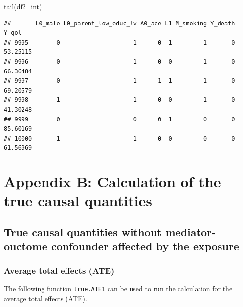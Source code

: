 \documentclass[
]{book}
\newenvironment{Shaded}{\begin{snugshade}}{\end{snugshade}}
\newcommand{\FunctionTok}[1]{\textcolor[rgb]{0.00,0.00,0.00}{#1}}
\newcommand{\NormalTok}[1]{#1}
\begin{document}
\begin{Shaded}
\begin{Highlighting}[]
\FunctionTok{tail}\NormalTok{(df2\_int)}
\end{Highlighting}
\end{Shaded}

\begin{verbatim}
##       L0_male L0_parent_low_educ_lv A0_ace L1 M_smoking Y_death    Y_qol
## 9995        0                     1      0  1         1       0 53.25115
## 9996        0                     1      0  0         1       0 66.36484
## 9997        0                     1      1  1         1       0 69.20579
## 9998        1                     1      0  0         1       0 41.30248
## 9999        0                     0      0  1         0       0 85.60169
## 10000       1                     1      0  0         0       0 61.56969
\end{verbatim}

\hypertarget{appendix_b}{%
\chapter{Appendix B: Calculation of the true causal quantities}\label{appendix_b}}

\hypertarget{true-causal-quantities-without-mediator-ouctome-confounder-affected-by-the-exposure}{%
\section{True causal quantities without mediator-ouctome confounder affected by the exposure}\label{true-causal-quantities-without-mediator-ouctome-confounder-affected-by-the-exposure}}

\hypertarget{average-total-effects-ate}{%
\subsection{Average total effects (ATE)}\label{average-total-effects-ate}}

The following function \texttt{true.ATE1} can be used to run the calculation for the average total effects (ATE).
\end{document}
